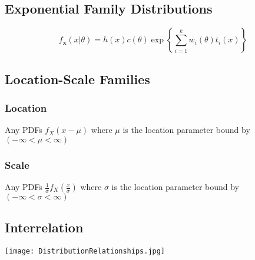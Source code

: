 		
	\subsection*{Exponential Family Distributions}
	\[ f_\mathbf{x}(x|\theta) = h(x)c(\theta) \exp \left\{ \sum_{i=1}^k w_i(\theta)t_i(x) \right\} \]
	
	\subsection*{Location-Scale Families}
		\subsubsection*{Location}
			Any PDFs \(f_X(x-\mu)\) where \(\mu\) is the 
			location parameter bound by \((-\infty<\mu<\infty)\)
			
		\subsubsection*{Scale}
			Any PDFs \(\frac{1}{\sigma}f_X(\frac{x}{\sigma})\) where \(\sigma\) is the 
			location parameter bound by \((-\infty<\sigma<\infty)\)
			
	
	\subsection*{Interrelation}
	\texttt{[image: DistributionRelationships.jpg]}
	

			
	
	
	
	
